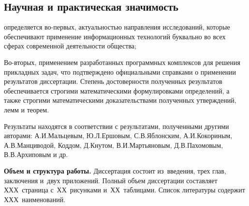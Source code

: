 \subsection*{Научная и практическая значимость}

определяется во-первых, актуальностью направления исследований, которые обеспечивают применение информационных технологий буквально во всех сферах современной деятельности общества;

Во-вторых, применением разработанных программных комплексов для решения прикладных задач, что подтверждено официальными справками о применении результатов диссертации.
Степень достоверности полученных результатов обеспечивается строгими математическими формулировками определений, а также строгими математическими доказательствами полученных утверждений, лемм и теорем.

Результаты находятся в соответствии с результатами, полученными другими авторами: А.И.Мальцевым, Ю.Л.Ершовым, С.В.Яблонским, А.И.Кокориным, А.В.Манциводой,  Коддом, Д.Кнутом, В.И.Мартьяновым, Д.В.Пахомовым, В.В.Архиповым и др.

%
%
%
%
%
%
%
%
%

\textbf{Объем и структура работы.} Диссертация состоит из~введения, трех глав, заключения и~двух приложений. Полный объем диссертации составляет ХХХ~страница с~ХХ~рисунками и~ХХ~таблицами. Список литературы содержит ХХХ~наименований.

\clearpage